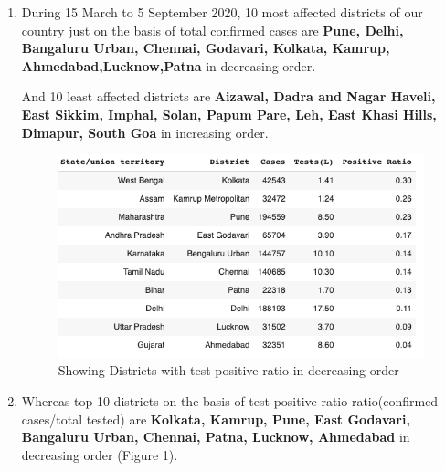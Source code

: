 \documentclass[12pt]{article}
\begin{document}
\begin{enumerate}

    \item During 15 March to 5 September 2020, 10 most affected districts of our country just on the basis of total confirmed cases are \textbf{Pune, Delhi, Bangaluru Urban, Chennai,  Godavari, Kolkata, Kamrup, Ahmedabad,Lucknow,Patna} in decreasing order.
    
    And 10 least affected districts are \textbf{Aizawal, Dadra and Nagar Haveli, East Sikkim, Imphal, Solan, Papum Pare, Leh, East Khasi Hills, Dimapur, South Goa} in increasing order.


\pagebreak
\begin{figure}[H]
\centering
\includegraphics[scale=.6]{Test_ratio.png}
\caption{Showing Districts with test positive ratio in decreasing order}
\end{figure}

\item Whereas top 10 districts on the basis of test positive ratio ratio(confirmed cases/total tested) are \textbf{Kolkata, Kamrup, Pune, East Godavari, Bangaluru Urban, Chennai, Patna, Lucknow, Ahmedabad} in decreasing order (Figure 1).
    


\end{enumerate}
\end{document}
